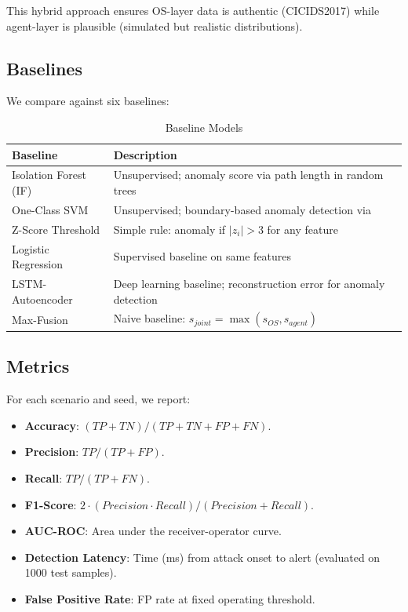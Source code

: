 \documentclass[conference]{IEEEtran}
\begin{document}
This hybrid approach ensures OS-layer data is authentic (CICIDS2017) while agent-layer is plausible (simulated but realistic distributions).

\subsection{Baselines}

We compare against six baselines:

\begin{table}[h]
\centering
\caption{Baseline Models}
\label{tab:baselines}
\begin{tabular}{lp{3.5cm}}
\toprule
Baseline & Description \\
\midrule
Isolation Forest (IF) & Unsupervised; anomaly score via path length in random trees \\
One-Class SVM & Unsupervised; boundary-based anomaly detection via~\cite{scholkopf2001support} \\
Z-Score Threshold & Simple rule: anomaly if $|z_i| > 3$ for any feature \\
Logistic Regression & Supervised baseline on same features \\
LSTM-Autoencoder & Deep learning baseline; reconstruction error for anomaly detection \\
Max-Fusion & Naive baseline: $s_{joint} = \max(s_{OS}, s_{agent})$ \\
\bottomrule
\end{tabular}
\end{table}

\subsection{Metrics}

For each scenario and seed, we report:
\begin{itemize}
\item \textbf{Accuracy}: $(TP+TN) / (TP+TN+FP+FN)$.
\item \textbf{Precision}: $TP / (TP+FP)$.
\item \textbf{Recall}: $TP / (TP+FN)$.
\item \textbf{F1-Score}: $2 \cdot (Precision \cdot Recall) / (Precision + Recall)$.
\item \textbf{AUC-ROC}: Area under the receiver-operator curve.
\item \textbf{Detection Latency}: Time (ms) from attack onset to alert (evaluated on 1000 test samples).
\item \textbf{False Positive Rate}: FP rate at fixed operating threshold.
\end{itemize}
\end{document}
